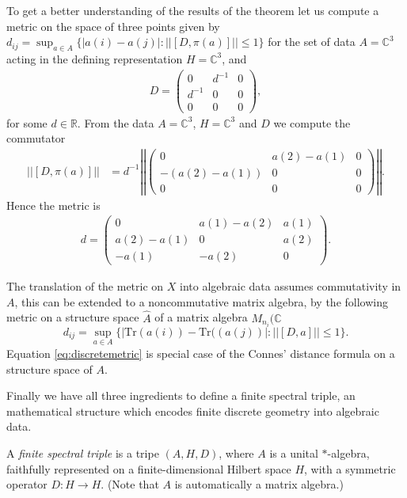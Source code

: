 To get a better understanding of the results of the theorem let us compute a
metric on the space of three points given by $d_{ij} = \sup_{a\in A}\{|a(i) -
a(j)|: ||[D, \pi(a)]|| \leq 1\}$ for the set of data $A = \mathbb{C}^3$ acting
in the defining representation $H = \mathbb{C}^3$, and
\begin{align}
    D =
    \begin{pmatrix}
        0 & d^{-1} & 0 \\ d^{-1} & 0 & 0 \\ 0 & 0 & 0
    \end{pmatrix},
\end{align}
for some $d \in \mathbb{R}$.
From the data $A=\mathbb{C}^3$, $H=\mathbb{C}^3$ and $D$ we compute the
commutator
\begin{align}
    \big|\big|[D, \pi(a)]\big|\big| &= d^{-1}\left|\left|
\begin{pmatrix}
    0 & a(2)-a(1) & 0 \\
    -(a(2)-a(1)) & 0 & 0 \\
    0 & 0 & 0
\end{pmatrix} \right|\right|.
\end{align}
Hence the metric is
\begin{align}
d =
    \begin{pmatrix}
        0 & a(1)-a(2) & a(1)  \\
        a(2)-a(1) & 0 & a(2) \\
        -a(1) & -a(2) & 0
    \end{pmatrix}.
\end{align}

The translation of the metric on $X$ into algebraic data assumes commutativity
in $A$, this can be extended to a noncommutative matrix algebra, by the
following metric on a structure space $\hat{A}$ of a matrix algebra
$M_{n_i}(\mathbb{C}$
\begin{equation}
    d_{ij} = \sup_{a\in A}\big\{|\text{Tr}(a(i)) - \text{Tr}((a(j))|: ||[D,
    a]|| \leq 1\big\}.\label{eq:discretemetric}
\end{equation}
Equation \eqref{eq:discretemetric} is special case of the Connes' distance
formula on a structure space of $A$.

Finally we have all three ingredients to define a finite spectral triple, an
mathematical structure which encodes finite discrete geometry into algebraic data.
\begin{mydefinition}
    A \textit{finite spectral triple} is a tripe $(A, H, D)$, where $A$ is a unital $*$-algebra,
    faithfully represented on a finite-dimensional Hilbert space $H$, with a symmetric operator
    $D: H \rightarrow H$. (Note that $A$ is automatically a matrix algebra.)
\end{mydefinition}

